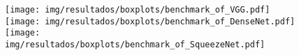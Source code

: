 \begin{figure}[h!]
	\texttt{[image: img/resultados/boxplots/benchmark\_of\_VGG.pdf]}
	\texttt{[image: img/resultados/boxplots/benchmark\_of\_DenseNet.pdf]}
	\texttt{[image: img/resultados/boxplots/benchmark\_of\_SqueezeNet.pdf]}
	\caption{}
	\label{fig:Time_of_Extreme nets}
\end{figure}
